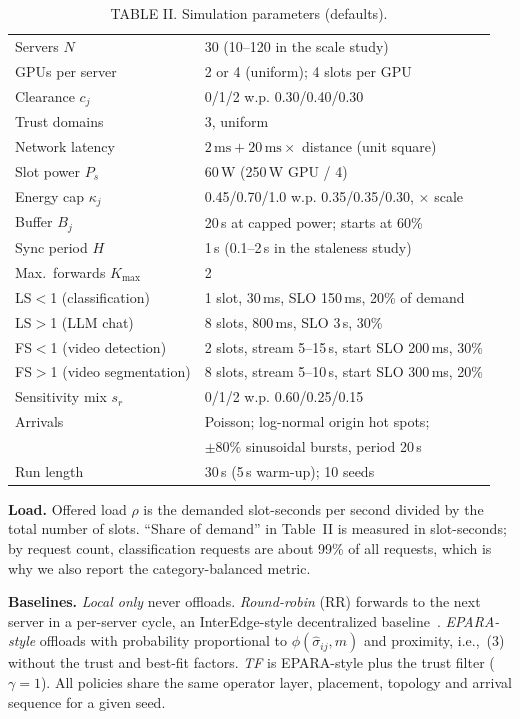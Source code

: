 \documentclass{article}
\begin{document}
\begin{table}[t]
\caption{TABLE II. Simulation parameters (defaults).}\label{tab:params}
\begin{tabular}{@{}ll@{}}
\toprule
Servers $N$ & 30 (10--120 in the scale study) \\
GPUs per server & 2 or 4 (uniform); 4 slots per GPU \\
Clearance $c_j$ & 0/1/2 w.p. 0.30/0.40/0.30 \\
Trust domains & 3, uniform \\
Network latency & $2\,\text{ms}+20\,\text{ms}\times$ distance (unit square) \\
Slot power $P_s$ & 60\,W (250\,W GPU / 4) \\
Energy cap $\kappa_j$ & 0.45/0.70/1.0 w.p. 0.35/0.35/0.30, $\times$ scale \\
Buffer $B_j$ & 20\,s at capped power; starts at 60\% \\
Sync period $H$ & 1\,s (0.1--2\,s in the staleness study) \\
Max.\ forwards $K_{\max}$ & 2 \\
\midrule
LS$<$1 (classification) & 1 slot, 30\,ms, SLO 150\,ms, 20\% of demand \\
LS$>$1 (LLM chat) & 8 slots, 800\,ms, SLO 3\,s, 30\% \\
FS$<$1 (video detection) & 2 slots, stream 5--15\,s, start SLO 200\,ms, 30\% \\
FS$>$1 (video segmentation) & 8 slots, stream 5--10\,s, start SLO 300\,ms, 20\% \\
\midrule
Sensitivity mix $s_r$ & 0/1/2 w.p. 0.60/0.25/0.15 \\
Arrivals & Poisson; log-normal origin hot spots; \\
 & $\pm80\%$ sinusoidal bursts, period 20\,s \\
Run length & 30\,s (5\,s warm-up); 10 seeds \\
\bottomrule
\end{tabular}
\end{table}

\textbf{Load.} Offered load $\rho$ is the demanded slot-seconds per second divided by the total number of slots. ``Share of demand'' in Table~II is measured in slot-seconds; by request count, classification requests are about 99\% of all requests, which is why we also report the category-balanced metric.

\textbf{Baselines.} \emph{Local only} never offloads. \emph{Round-robin} (RR) forwards to the next server in a per-server cycle, an InterEdge-style decentralized baseline~\cite{interedge,epara2025}. \emph{EPARA-style} offloads with probability proportional to $\phi(\hat\sigma_{ij},m)$ and proximity, i.e.,~(3) without the trust and best-fit factors. \emph{TF} is EPARA-style plus the trust filter ($\gamma=1$). All policies share the same operator layer, placement, topology and arrival sequence for a given seed.
\end{document}
